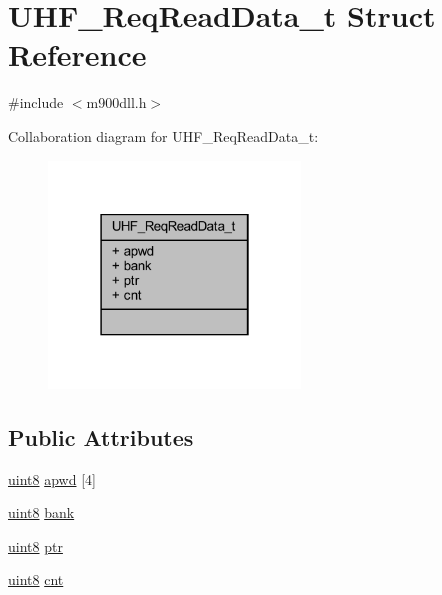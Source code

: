 \hypertarget{struct_u_h_f___req_read_data__t}{}\section{U\+H\+F\+\_\+\+Req\+Read\+Data\+\_\+t Struct Reference}
\label{struct_u_h_f___req_read_data__t}


{\ttfamily \#include $<$m900dll.\+h$>$}



Collaboration diagram for U\+H\+F\+\_\+\+Req\+Read\+Data\+\_\+t\+:
\nopagebreak
\begin{figure}[H]
\begin{center}
\leavevmode
\includegraphics[width=190pt]{struct_u_h_f___req_read_data__t__coll__graph}
\end{center}
\end{figure}
\subsection*{Public Attributes}
\begin{DoxyCompactItemize}
\item 
\mbox{\hyperlink{m900dll_8h_adde6aaee8457bee49c2a92621fe22b79}{uint8}} \mbox{\hyperlink{struct_u_h_f___req_read_data__t_a379927c7ffdb967de9d1416e39ccb992}{apwd}} \mbox{[}4\mbox{]}
\item 
\mbox{\hyperlink{m900dll_8h_adde6aaee8457bee49c2a92621fe22b79}{uint8}} \mbox{\hyperlink{struct_u_h_f___req_read_data__t_a9b09d6c2d0d05cd0acdcb3ae193c2a1a}{bank}}
\item 
\mbox{\hyperlink{m900dll_8h_adde6aaee8457bee49c2a92621fe22b79}{uint8}} \mbox{\hyperlink{struct_u_h_f___req_read_data__t_a17235c8462b620de70acd4eeb074a0a6}{ptr}}
\item 
\mbox{\hyperlink{m900dll_8h_adde6aaee8457bee49c2a92621fe22b79}{uint8}} \mbox{\hyperlink{struct_u_h_f___req_read_data__t_a96ac3297016773a0cb5f41c5e61a531a}{cnt}}
\end{DoxyCompactItemize}


